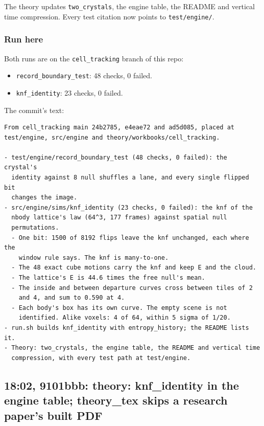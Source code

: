The theory updates \texttt{two\_\allowbreak{}crystals}, the engine table, the README and vertical time compression. Every test citation now points to \texttt{test/\allowbreak{}engine/\allowbreak{}}.

\subsubsection{\texorpdfstring{Run here}{Run here}}

Both runs are on the \texttt{cell\_\allowbreak{}tracking} branch of this repo:

\begin{itemize}
\item \texttt{record\_\allowbreak{}boundary\_\allowbreak{}test}: 48 checks, 0 failed.
\item \texttt{knf\_\allowbreak{}identity}: 23 checks, 0 failed.
\end{itemize}

The commit's text:

\begin{Verbatim}
From cell_tracking main 24b2785, e4eae72 and ad5d085, placed at
test/engine, src/engine and theory/workbooks/cell_tracking.

- test/engine/record_boundary_test (48 checks, 0 failed): the crystal's
  identity against 8 null shuffles a lane, and every single flipped bit
  changes the image.
- src/engine/sims/knf_identity (23 checks, 0 failed): the knf of the
  nbody lattice's law (64^3, 177 frames) against spatial null
  permutations.
  - One bit: 1500 of 8192 flips leave the knf unchanged, each where the
    window rule says. The knf is many-to-one.
  - The 48 exact cube motions carry the knf and keep E and the cloud.
  - The lattice's E is 44.6 times the free null's mean.
  - The inside and between departure curves cross between tiles of 2
    and 4, and sum to 0.590 at 4.
  - Each body's box has its own curve. The empty scene is not
    identified. Alike voxels: 4 of 64, within 5 sigma of 1/20.
- run.sh builds knf_identity with entropy_history; the README lists it.
- Theory: two_crystals, the engine table, the README and vertical time
  compression, with every test path at test/engine.
\end{Verbatim}

\subsection{\texorpdfstring{18:02, 9101bbb: theory: knf\_\allowbreak{}identity in the engine table; theory\_\allowbreak{}tex skips a research paper's built PDF}{18:02, 9101bbb: theory: knf\_identity in the engine table; theory\_tex skips a research paper's built PDF}}

